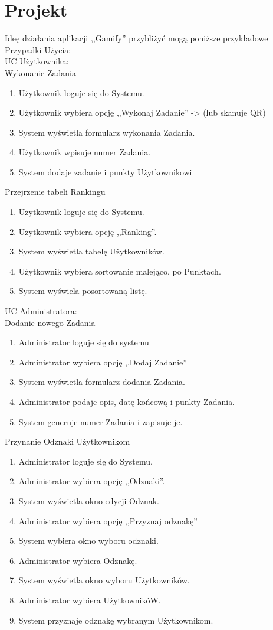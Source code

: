 \documentclass[a4paper,12pt,twoside,openany]{report}
\begin{document}
	\section{Projekt}
	Ideę działania aplikacji ,,Gamify'' przybliżyć mogą poniższe przykładowe Przypadki Użycia:\\
	UC Użytkownika:\\
	Wykonanie Zadania
	\begin{enumerate}
		\item Użytkownik loguje się do Systemu.
		\item Użytkownik wybiera opcję ,,Wykonaj Zadanie'' -> (lub skanuje QR)
		\item System wyświetla formularz wykonania Zadania.
		\item Użytkownik wpisuje numer Zadania.
		\item System dodaje zadanie i punkty Użytkownikowi
	\end{enumerate}
	Przejrzenie tabeli Rankingu
	\begin{enumerate}
		\item Użytkownik loguje się do Systemu.
		\item Użytkownik wybiera opcję ,,Ranking''.
		\item System wyświetla tabelę Użytkowników.
		\item Użytkownik wybiera sortowanie malejąco, po Punktach.
		\item System wyświela posortowaną listę.
	\end{enumerate}
	UC Administratora:\\
	Dodanie nowego Zadania
	\begin{enumerate}
		\item Administrator loguje się do systemu
		\item Administrator wybiera opcję ,,Dodaj Zadanie''
		\item System wyświetla formularz dodania Zadania.
		\item Administrator podaje opis, datę końcową i punkty Zadania.
		\item System generuje numer Zadania i zapisuje je.
	\end{enumerate}
	Przynanie Odznaki Użytkownikom
	\begin{enumerate}
		\item Administrator loguje się do Systemu.
		\item Administrator wybiera opcję ,,Odznaki''.
		\item System wyświetla okno edycji Odznak.
		\item Administrator wybiera opcję ,,Przyznaj odznakę''
		\item System wybiera okno wyboru odznaki.
		\item Administrator wybiera Odznakę.
		\item System wyświetla okno wyboru Użytkowników.
		\item Administrator wybiera UżytkownikóW.
		\item System przyznaje odznakę wybranym Użytkownikom.
	\end{enumerate}
	
\end{document}
